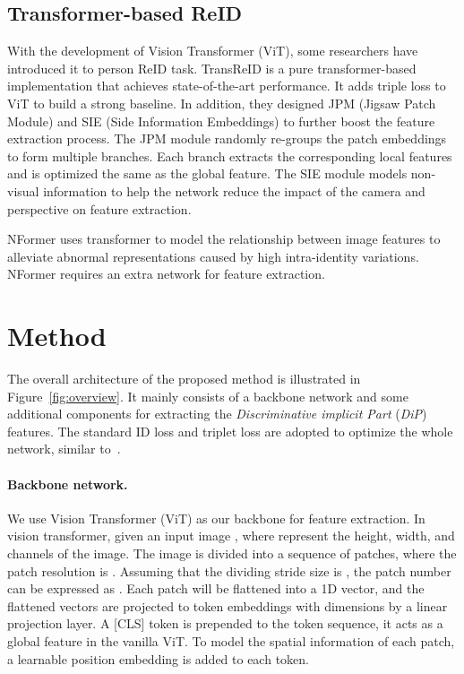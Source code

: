 \documentclass[10pt,twocolumn,letterpaper]{article}
\begin{document}
\subsection{Transformer-based ReID}
\label{sec:transformer-based}
With the development of Vision Transformer\cite{dosovitskiy2020vit} (ViT), some researchers have introduced it to person ReID task. TransReID\cite{He_2021_ICCV} is a pure transformer-based implementation that achieves state-of-the-art performance. It adds triple loss to ViT to build a strong baseline. In addition, they designed JPM (Jigsaw Patch Module) and SIE (Side Information Embeddings) to further boost the feature extraction process. The JPM module randomly re-groups the patch embeddings to form multiple branches. Each branch extracts the corresponding local features and is optimized the same as the global feature. The SIE module models non-visual information to help the network reduce the impact of the camera and perspective on feature extraction. 

NFormer\cite{wang2022nformer} uses transformer to model the relationship between image features to alleviate abnormal representations caused by high intra-identity variations. NFormer requires an extra network for feature extraction.


\section{Method}
\label{sec:method}

The overall architecture of the proposed method is illustrated in Figure~\ref{fig:overview}. It mainly consists of a backbone network and some additional components for extracting the \textit{Discriminative implicit Part} (\textit{DiP}) features.
The standard ID loss and triplet loss are adopted to optimize the whole network, similar to~\cite{chen2019abd, He_2021_ICCV, wang2018learning, wang2022nformer, chen2020cluster, chen2021video}.

\vspace{-0.4cm}
\paragraph{Backbone network.}
We use Vision Transformer\cite{dosovitskiy2020vit} (ViT) as our backbone for feature extraction. In vision transformer, given an input image , where  represent the height, width, and channels of the image. The image is divided into a sequence of  patches, where the patch resolution is . Assuming that the dividing stride size is , the patch number  can be expressed as \cite{He_2021_ICCV}. Each patch will be flattened into a 1D vector, and the  flattened vectors are projected to  token embeddings with  dimensions by a linear projection layer. A [CLS] token is prepended to the token sequence, it acts as a global feature in the vanilla ViT\cite{dosovitskiy2020vit}. To model the spatial information of each patch, a learnable position embedding is added to each token.
\end{document}
